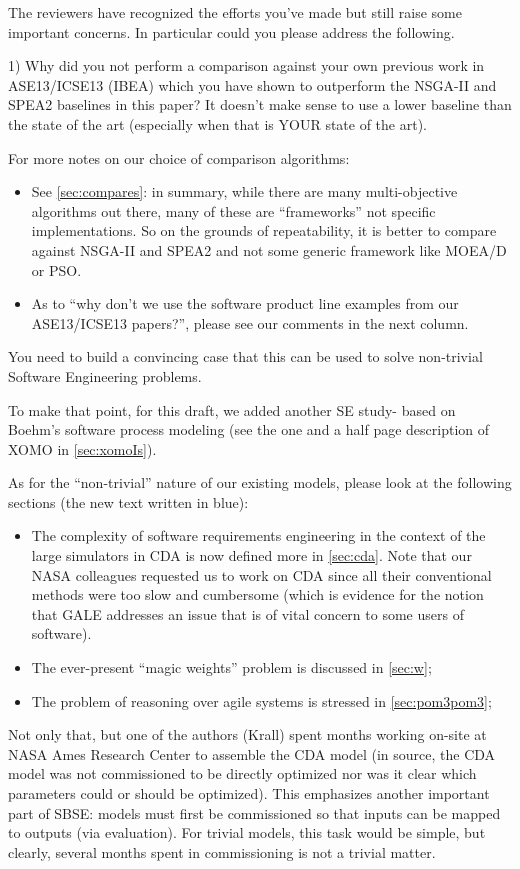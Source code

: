 \documentclass[10pt,journal,compsoc]{IEEEtran}
\newcommand{\bi}{\begin{itemize}}
\newcommand{\ei}{\end{itemize}}
\newcommand{\tion}[1]{\textsection\ref{sec:#1}}
\newenvironment{changed}{\par\color{MyDarkBlue}}{\par}
\begin{document}
The reviewers have recognized the efforts you've made but still raise some important concerns.  In particular could you please address the following.


1) Why did you not perform a comparison against your own previous work in ASE13/ICSE13 (IBEA) which you have shown to outperform the NSGA-II and SPEA2 baselines in this paper?   It doesn't make sense to use a lower baseline than the state of the art (especially when that is YOUR state of the art).

\begin{changed}


For more notes on our choice of comparison algorithms:
\bi
\item
See \tion{compares}: in summary, while there are many multi-objective algorithms out
there, many of these are ``frameworks'' not specific implementations.
So on the grounds of repeatability, it is better to compare against
NSGA-II and SPEA2 and not some generic framework like MOEA/D or PSO.
\item As to ``why don't we use the software product line examples from
our ASE13/ICSE13 papers?'', please see our comments in the next column.
\ei


\end{changed}

You need to build a convincing case that this can be
used to solve non-trivial Software Engineering
problems.  
\begin{changed}
To make that point, for this draft,
we added another SE study- based on Boehm's
software process modeling (see the one and a half page description
of XOMO in \tion{xomoIs}).


As for the ``non-trivial'' nature of our existing models,
please look at the following sections (the new text written in blue):
\bi
\item
The complexity of software requirements engineering in the context
of the large simulators in CDA is now defined more in \tion{cda}.
Note that our NASA colleagues requested us to work on CDA
since all their conventional methods were too slow and cumbersome (which is
evidence for the notion that GALE addresses an issue that is of
vital concern to some users of software).
\item
The ever-present ``magic weights'' problem is discussed in \tion{w};
\item
The problem of reasoning over agile systems is stressed in \tion{pom3pom3};
\ei

Not only that, but one of the authors (Krall)
spent months working on-site at NASA Ames Research Center to assemble the CDA model (in source,
the CDA model was not commissioned to be directly optimized nor was it clear which parameters could
or should be optimized).  This emphasizes another important part of SBSE: models must first be commissioned
so that inputs can be mapped to outputs (via evaluation).  For trivial models, this task would be simple, but
clearly, several months spent in commissioning is not a trivial matter.
\end{changed}
\end{document}
